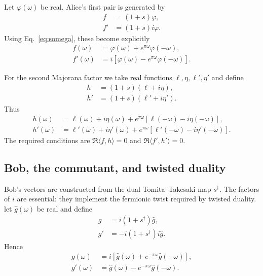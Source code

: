 \documentclass[11pt]{article}
\begin{document}
Let $\varphi(\omega)$ be real. Alice's first pair is generated by
\begin{align}
 f&=(1+s)\varphi,
 \label{eq:fconstruct}\\
 f'&=(1+s)i\varphi.
 \label{eq:fpconstruct}
\end{align}
Using Eq.~\eqref{eq:somega}, these become explicitly
\begin{align}
 f(\omega)&=\varphi(\omega)+e^{\pi\omega}\varphi(-\omega),
 \label{eq:fexplicit}\\
 f'(\omega)&=i\left[\varphi(\omega)-e^{\pi\omega}\varphi(-\omega)\right].
 \label{eq:fpexplicit}
\end{align}

For the second Majorana factor we take real functions $\ell,\eta,\ell',\eta'$ and define
\begin{align}
 h&=(1+s)(\ell+i\eta),
 \label{eq:hconstruct}\\
 h'&=(1+s)(\ell'+i\eta').
 \label{eq:hpconstruct}
\end{align}
Thus
\begin{align}
 h(\omega)
 &=\ell(\omega)+i\eta(\omega)
 +e^{\pi\omega}\left[\ell(-\omega)-i\eta(-\omega)\right],
 \label{eq:hexplicit}\\
 h'(\omega)
 &=\ell'(\omega)+i\eta'(\omega)
 +e^{\pi\omega}\left[\ell'(-\omega)-i\eta'(-\omega)\right].
 \label{eq:hpexplicit}
\end{align}
The required conditions are $\Re\langle f,h\rangle=0$ and $\Re\langle f',h'\rangle=0$.

\subsection{Bob, the commutant, and twisted duality}

Bob's vectors are constructed from the dual Tomita--Takesaki map $s^\dagger$. The factors of $i$ are essential: they implement the fermionic twist required by twisted duality. let $\widehat g(\omega)$ be real and define
\begin{align}
 g&=i(1+s^\dagger)\widehat g,
 \label{eq:gconstruct}\\
 g'&=-i(1+s^\dagger)i\widehat g.
 \label{eq:gpconstruct}
\end{align}
Hence
\begin{align}
 g(\omega)&=i\left[\widehat g(\omega)+e^{-\pi\omega}\widehat g(-\omega)\right],
 \label{eq:gexplicit}\\
 g'(\omega)&=\widehat g(\omega)-e^{-\pi\omega}\widehat g(-\omega).
 \label{eq:gpexplicit}
\end{align}
\end{document}
